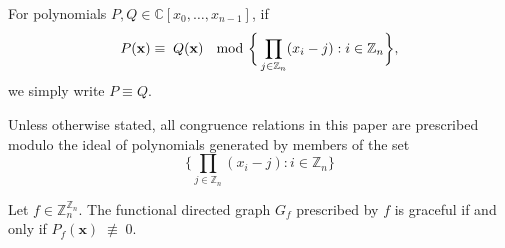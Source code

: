 \begin{defn}\label{defn:polynomial-congruence}
For polynomials $P,Q \in \mathbb{C}[x_0, \ldots, x_{n-1}]$, if
\begin{equation}
P({\bf x}) \equiv \; Q({\bf x}) \; \mod\bigg\{\prod_{j\in\mathbb{Z}_{n}}(x_{i}-j):i\in\mathbb{Z}_{n}\bigg\},
\end{equation}
we simply write $P \equiv Q$.
\end{defn}
 Unless otherwise stated, all congruence relations in this paper are prescribed modulo the ideal of polynomials generated by members of the set
\[
\bigg\{\prod_{j\in\mathbb{Z}_{n}}(x_{i}-j):i\in\mathbb{Z}_{n}\bigg\}
\]
\begin{proposition}\label{prop:polynomial-grace-certificate}
Let $f\in\mathbb{Z}_{n}^{\mathbb{Z}_{n}}$. The functional
directed graph $G_f$ prescribed by $f$ is graceful if and only if $P_f(\mathbf{x}) \; \not\equiv \; 0$.
\end{proposition}
